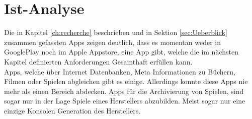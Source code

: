 \chapter{Ist-Analyse}

Die in Kapitel \ref{ch:recherche} beschrieben und in Sektion \ref{sec:Ueberblick} zusammen gefassten Apps zeigen deutlich, dass es momentan weder in GooglePlay noch im Apple Appstore, eine App gibt, welche die im nächsten Kapitel definierten Anforderungen Gesamthaft erfüllen kann.\\

Apps, welche über Internet Datenbanken, Meta Informationen zu Büchern, Filmen oder Spielen abgleichen gibt es einige. Allerdings konnte diese Apps nie mehr als einen Bereich abdecken. Apps für die Archivierung von Spielen, sind sogar nur in der Lage Spiele eines Herstellers abzubilden. Meist sogar nur eine einzige Konsolen Generation des Herstellers.